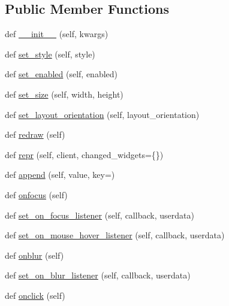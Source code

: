 \subsection*{Public Member Functions}
\begin{DoxyCompactItemize}
\item 
def \hyperlink{classremi_1_1gui_1_1Widget_a019461caad067039a94ba58c97db947f}{\+\_\+\+\_\+init\+\_\+\+\_\+} (self, kwargs)
\item 
def \hyperlink{classremi_1_1gui_1_1Widget_a9b04b4271704bd141203d25ed0f0df1f}{set\+\_\+style} (self, style)
\item 
def \hyperlink{classremi_1_1gui_1_1Widget_a67f9e7bf2a0e8bdf308461e394279f5f}{set\+\_\+enabled} (self, enabled)
\item 
def \hyperlink{classremi_1_1gui_1_1Widget_a7812a9476b73780a273413656ec406ad}{set\+\_\+size} (self, width, height)
\item 
def \hyperlink{classremi_1_1gui_1_1Widget_a96a7d0342b8d9c274c84d32fd4ba9a0b}{set\+\_\+layout\+\_\+orientation} (self, layout\+\_\+orientation)
\item 
def \hyperlink{classremi_1_1gui_1_1Widget_ad0a2d54c3af3cad22d5c0dfef04bf836}{redraw} (self)
\item 
def \hyperlink{classremi_1_1gui_1_1Widget_a67e2320662bd4a6e9705816ba2fff9ae}{repr} (self, client, changed\+\_\+widgets=\{\})
\item 
def \hyperlink{classremi_1_1gui_1_1Widget_a131564831f6fd2b468be84c47e0b2115}{append} (self, value, key=\textquotesingle{}\textquotesingle{})
\item 
def \hyperlink{classremi_1_1gui_1_1Widget_ac6d1b9a2fae13a9f915a7cf24a70962a}{onfocus} (self)
\item 
def \hyperlink{classremi_1_1gui_1_1Widget_ab524f235c7dd5d60d5cb2fa5821ad448}{set\+\_\+on\+\_\+focus\+\_\+listener} (self, callback, userdata)
\item 
def \hyperlink{classremi_1_1gui_1_1Widget_a1725d293967b2238034de4882b40ff7e}{set\+\_\+on\+\_\+mouse\+\_\+hover\+\_\+listener} (self, callback, userdata)
\item 
def \hyperlink{classremi_1_1gui_1_1Widget_ae0882945f8fb3fc4ce42203fe2e9a6c4}{onblur} (self)
\item 
def \hyperlink{classremi_1_1gui_1_1Widget_ad112638ff1e83425a7796ee95bb99d3f}{set\+\_\+on\+\_\+blur\+\_\+listener} (self, callback, userdata)
\item 
def \hyperlink{classremi_1_1gui_1_1Widget_ad036cd96fa5abd6055fa875fa150f08c}{onclick} (self)
\item 

\end{DoxyCompactItemize}

